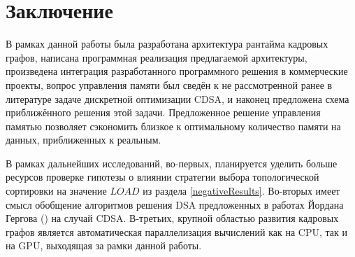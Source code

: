 \section{Заключение}
В рамках данной работы была разработана архитектура рантайма кадровых графов, написана программная реализация предлагаемой архитектуры, произведена интеграция разработанного программного решения в коммерческие проекты, вопрос управления памяти был сведён к не рассмотренной ранее в литературе задаче дискретной оптимизации CDSA, и наконец предложена схема приближённого решения этой задачи.
Предложенное решение управления памятью позволяет сэкономить близкое к оптимальному количество памяти на данных, приближенных к реальным.

В рамках дальнейших исследований, во-первых, планируется уделить больше ресурсов проверке гипотезы о влиянии стратегии выбора топологической сортировки на значение $LOAD$ из раздела \ref{negativeResults}. Во-вторых имеет смысл обобщение алгоритмов решения DSA предложенных в работах Йордана Гергова (\cite{gergov_approximation_1996, gergov_algorithms_1999}) на случай CDSA. В-третьих, крупной областью развития кадровых графов является автоматическая параллелизация вычислений как на CPU, так и на GPU, выходящая за рамки данной работы.
